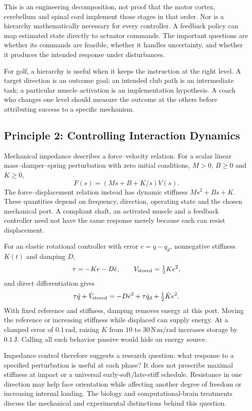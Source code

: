 This is an engineering decomposition, not proof that the motor cortex, cerebellum and spinal cord implement those stages in that order. Nor is a hierarchy mathematically necessary for every controller. A feedback policy can map estimated state directly to actuator commands. The important questions are whether its commands are feasible, whether it handles uncertainty, and whether it produces the intended response under disturbances.

For golf, a hierarchy is useful when it keeps the instruction at the right level. A target direction is an outcome goal; an intended club path is an intermediate task; a particular muscle activation is an implementation hypothesis. A coach who changes one level should measure the outcome at the others before attributing success to a specific mechanism.

\subsection{Principle 2: Controlling Interaction Dynamics}

Mechanical impedance describes a force--velocity relation. For a scalar linear mass--damper--spring perturbation with zero initial conditions, $M>0$, $B\geq0$ and $K\geq0$,
\[
F(s)=(Ms+B+K/s)V(s).
\]
The force--displacement relation instead has dynamic stiffness $Ms^2+Bs+K$. These quantities depend on frequency, direction, operating state and the chosen mechanical port. A compliant shaft, an activated muscle and a feedback controller need not have the same response merely because each can resist displacement.

For an elastic rotational controller with error $e=q-q_d$, nonnegative stiffness $K(t)$ and damping $D$,
\[
\tau=-Ke-D\dot e,\qquad V_{\rm stored}=\tfrac12Ke^2,
\]
and direct differentiation gives
\[
\tau\dot q+\dot V_{\rm stored}
=-D\dot e^2+\tau\dot q_d+\tfrac12\dot K e^2.
\]
With fixed reference and stiffness, damping removes energy at this port. Moving the reference or increasing stiffness while displaced can supply energy. At a clamped error of $0.1\,\mathrm{rad}$, raising $K$ from $10$ to $30\,\mathrm{N\,m/rad}$ increases storage by $0.1\,\mathrm{J}$. Calling all such behavior passive would hide an energy source.

Impedance control therefore suggests a research question: what response to a specified perturbation is useful at each phase? It does not prescribe maximal stiffness at impact or a universal early-soft/late-stiff schedule. Resistance in one direction may help face orientation while affecting another degree of freedom or increasing internal loading. The biology and computational-brain treatments discuss the mechanical and experimental distinctions behind this question.

